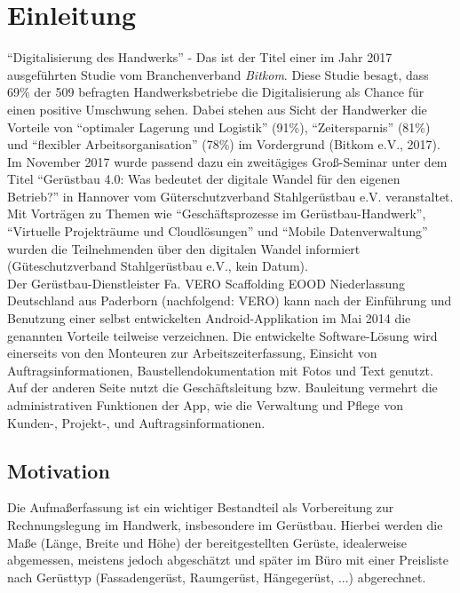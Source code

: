 \chapter{Einleitung}
``Digitalisierung des Handwerks'' - Das ist der Titel einer im Jahr 2017 ausgeführten Studie vom Branchenverband \textit{Bitkom}. 
Diese Studie besagt, dass 69\% der 509 befragten Handwerksbetriebe die Digitalisierung als Chance für einen positive Umschwung sehen. 
Dabei stehen aus Sicht der Handwerker die Vorteile von ``optimaler Lagerung und Logistik'' (91\%), ``Zeitersparnis'' (81\%) und ``flexibler Arbeitsorganisation'' (78\%) im Vordergrund (Bitkom e.V., 2017). \\

Im November 2017 wurde passend dazu ein zweitägiges Groß-Seminar unter dem Titel ``Gerüstbau 4.0: Was bedeutet der digitale Wandel für den eigenen Betrieb?'' in Hannover vom Güterschutzverband Stahlgerüstbau e.V. veranstaltet. 
Mit Vorträgen zu Themen wie ``Geschäftsprozesse im Gerüstbau-Handwerk'', ``Virtuelle Projekträume und Cloudlösungen'' und ``Mobile Datenverwaltung'' wurden die Teilnehmenden über den digitalen Wandel informiert (Güteschutzverband Stahlgerüstbau e.V., kein Datum). \\

Der Gerüstbau-Dienstleister Fa. VERO Scaffolding EOOD Niederlassung Deutschland aus Paderborn (nachfolgend: \textsc{VERO}) kann nach der Einführung und Benutzung einer selbst entwickelten Android-Applikation im Mai 2014 die genannten Vorteile teilweise verzeichnen.
Die entwickelte Software-Lösung wird einerseits von den Monteuren zur Arbeitszeiterfassung, Einsicht von Auftragsinformationen, Baustellendokumentation mit Fotos und Text genutzt. Auf der anderen Seite nutzt die Geschäftsleitung bzw. Bauleitung vermehrt die administrativen Funktionen der App, wie die Verwaltung und Pflege von Kunden-, Projekt-, und Auftragsinformationen. \\


\section{Motivation}

Die Aufmaßerfassung ist ein wichtiger Bestandteil als Vorbereitung zur Rechnungslegung im Handwerk, insbesondere im Gerüstbau. Hierbei werden die Maße (Länge, Breite und Höhe) der bereitgestellten Gerüste, idealerweise abgemessen, meistens jedoch abgeschätzt und später im Büro mit einer Preisliste nach Gerüsttyp (Fassadengerüst, Raumgerüst, Hängegerüst, ...) abgerechnet. \\

